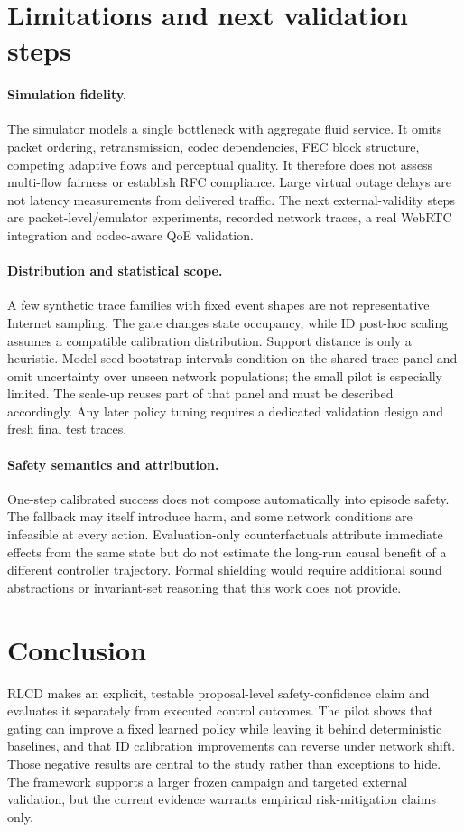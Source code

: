 \documentclass[10pt]{article}
\begin{document}
\section{Limitations and next validation steps}
\paragraph{Simulation fidelity.}
The simulator models a single bottleneck with aggregate fluid service. It omits packet ordering, retransmission, codec dependencies, FEC block structure, competing adaptive flows and perceptual quality. It therefore does not assess multi-flow fairness or establish RFC compliance. Large virtual outage delays are not latency measurements from delivered traffic. The next external-validity steps are packet-level/emulator experiments, recorded network traces, a real WebRTC integration and codec-aware QoE validation.

\paragraph{Distribution and statistical scope.}
A few synthetic trace families with fixed event shapes are not representative Internet sampling. The gate changes state occupancy, while ID post-hoc scaling assumes a compatible calibration distribution. Support distance is only a heuristic. Model-seed bootstrap intervals condition on the shared trace panel and omit uncertainty over unseen network populations; the small pilot is especially limited. The scale-up reuses part of that panel and must be described accordingly. Any later policy tuning requires a dedicated validation design and fresh final test traces.

\paragraph{Safety semantics and attribution.}
One-step calibrated success does not compose automatically into episode safety. The fallback may itself introduce harm, and some network conditions are infeasible at every action. Evaluation-only counterfactuals attribute immediate effects from the same state but do not estimate the long-run causal benefit of a different controller trajectory. Formal shielding would require additional sound abstractions or invariant-set reasoning that this work does not provide.

\section{Conclusion}
RLCD makes an explicit, testable proposal-level safety-confidence claim and evaluates it separately from executed control outcomes. The pilot shows that gating can improve a fixed learned policy while leaving it behind deterministic baselines, and that ID calibration improvements can reverse under network shift. Those negative results are central to the study rather than exceptions to hide. The framework supports a larger frozen campaign and targeted external validation, but the current evidence warrants empirical risk-mitigation claims only.
\end{document}
